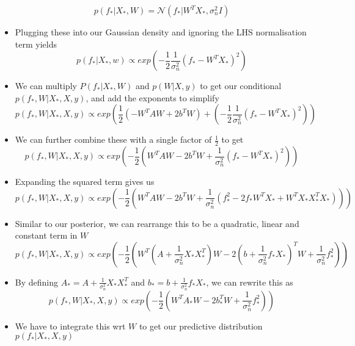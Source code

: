 \documentclass[12pt]{article}
\begin{document}
\begin{itemize}
\begin{equation}
    p(f_* | X_*, W) = \mathcal{N}(f_* | W^TX_*, \sigma^2_nI)
\end{equation}
    \item Plugging these into our Gaussian density and ignoring the LHS normalisation term yields
\begin{equation}
    p(f_*|X_*,w) \propto exp\left(-\frac{1}{2}\frac{1}{\sigma^2_n}(f_* - W^TX_*)^2\right)
\end{equation}
    \item We can multiply $P(f_*|X_*,W)$ and $p(W|X,y)$ to get our conditional $p(f_*, W|X_*,X,y)$, and add the exponents to simplify
\begin{equation}
    p(f_*,W|X_*,X,y) \propto exp\left(\frac{1}{2}(-W^TAW + 2b^TW) + \left(-\frac{1}{2}\frac{1}{\sigma^2_n}(f_* - W^TX_*)^2\right)\right)
\end{equation}
    \item We can further combine these with a single factor of $\frac{1}{2}$ to get
\begin{equation}
    p(f_*,W|X_*,X,y) \propto exp\left(-\frac{1}{2}\left(W^TAW - 2b^TW + \frac{1}{\sigma^2_n}(f_* - W^TX_*)^2\right)\right)
\end{equation}
    \item Expanding the squared term gives us
\begin{equation}
    p(f_*,W|X_*,X,y) \propto exp\left(-\frac{1}{2}\left(W^TAW - 2b^TW + \frac{1}{\sigma^2_n}(f_*^2 - 2f_*W^TX_* + W^TX_*X_*^TX_*)\right)\right)
\end{equation}
    \item Similar to our posterior, we can rearrange this to be a quadratic, linear and constant term in $W$
\begin{equation}
    p(f_*,W|X_*,X,y) \propto exp\left(-\frac{1}{2}\left(W^T\left(A + \frac{1}{\sigma^2_n}X_*X_*^T\right)W - 2\left(b + \frac{1}{\sigma^2_n}f_*X_*\right)^TW + \frac{1}{\sigma_n^2}f_*^2\right)\right)
\end{equation}
    \item By defining $A_* = A + \frac{1}{\sigma^2_n}X_*X_*^T$ and $b_* = b + \frac{1}{\sigma^2_n}f_*X_*$, we can rewrite this as
\begin{equation}
    p(f_*,W|X_*,X,y) \propto exp\left(-\frac{1}{2}\left(W^TA_*W - 2b_*^TW + \frac{1}{\sigma_n^2}f_*^2\right)\right)
\end{equation}
    \item We have to integrate this wrt $W$ to get our predictive distribution $p(f_*|X_*,X,y)$

\end{itemize}
\end{document}
